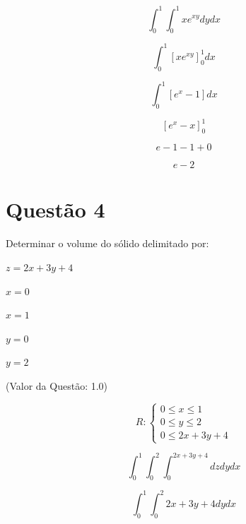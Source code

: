 \documentclass[10pt,a4paper]{article}
\begin{document}
	\begin{equation*}
		\int_0^1 \int_0^1 x e^{xy} dy dx
	\end{equation*}
	
	\begin{equation*}
		\int_0^1 \left[ x e^{xy} \right]_0^1 dx
	\end{equation*}
	
	\begin{equation*}
		\int_0^1 \left[ e^x - 1 \right] dx
	\end{equation*}
	
	\begin{equation*}
		\left[ e^x - x\right]_0^1
	\end{equation*}
	
	\begin{equation*}
		e - 1 - 1 + 0
	\end{equation*}
	
	\begin{equation}
		e - 2
	\end{equation}
	
	\section*{Questão 4}
	
	Determinar o volume do sólido delimitado por:
	
	$ z = 2x+3y+4 $
	
	$ x = 0 $
	
	$ x = 1 $
	
	$ y = 0 $
	
	$ y = 2 $
	
	(Valor da Questão: 1.0)
	
	
	
	\begin{equation*}
		R:
		\begin{cases}
			0 \le x \le 1 \\
			0 \le y \le 2 \\
			0 \le 2x + 3y + 4
		\end{cases}
	\end{equation*}
	
	\begin{equation*}
		\int_{0}^{1} \int_{0}^{2} \int_{0}^{2x + 3y + 4} dz dy dx
	\end{equation*}
	
	\begin{equation*}
		\int_{0}^{1} \int_{0}^{2} 2x + 3y + 4 dy dx
	\end{equation*}
	
\end{document}
